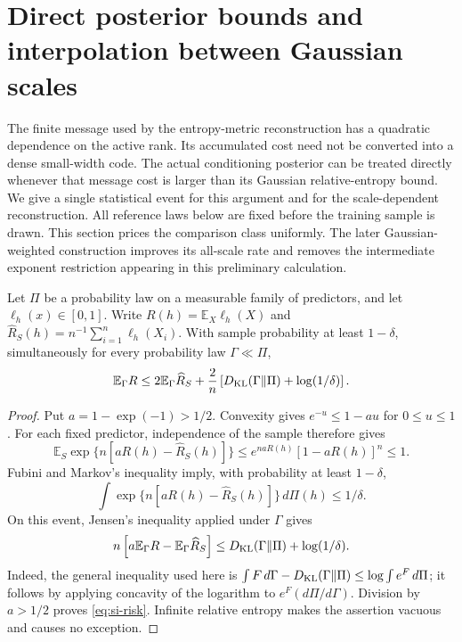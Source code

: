 \section{Direct posterior bounds and interpolation between Gaussian scales}
\label{app:scale-interpolation}

The finite message used by the entropy-metric reconstruction has a
quadratic dependence on the active rank. Its accumulated cost need not
be converted into a dense small-width code. The actual conditioning
posterior can be treated directly whenever that message cost is larger
than its Gaussian relative-entropy bound. We give a single statistical
event for this argument and for the scale-dependent reconstruction.
All reference laws below are fixed before the training sample is drawn.
This section prices the comparison class uniformly. The later
Gaussian-weighted construction improves its all-scale rate and removes
the intermediate exponent restriction appearing in this preliminary
calculation.

\begin{lemma}
\label{lem:si-risk}
Let $\Pi$ be a probability law on a measurable family of predictors,
and let $\ell_h(x)\in[0,1]$. Write
$R(h)=\mathbb E_X\ell_h(X)$ and
$\widehat R_S(h)=n^{-1}\sum_{i=1}^n\ell_h(X_i)$.
With sample probability at least $1-\delta$, simultaneously for every
probability law $\Gamma\ll\Pi$,
\begin{equation}\label{eq:si-risk}
 \mathbb E_\Gamma R
 \le 2\mathbb E_\Gamma\widehat R_S
       +\frac{2}{n}
          \left[D_{\rm KL}(\Gamma\Vert\Pi)+\log(1/\delta)\right].
\end{equation}
\end{lemma}
\begin{proof}
Put $a=1-\exp(-1)>1/2$. Convexity gives
$e^{-u}\le1-au$ for $0\le u\le1$. For each fixed predictor,
independence of the sample therefore gives
\[
 \mathbb E_S\exp\{n[aR(h)-\widehat R_S(h)]\}
 \le e^{naR(h)}[1-aR(h)]^n\le1.
\]
Fubini and Markov's inequality imply, with probability at least
$1-\delta$,
\[
 \int\exp\{n[aR(h)-\widehat R_S(h)]\}\,d\Pi(h)
 \le1/\delta.
\]
On this event, Jensen's inequality applied under $\Gamma$ gives
\[
 n\left[a\mathbb E_\Gamma R-
                   \mathbb E_\Gamma\widehat R_S\right]
 \le D_{\rm KL}(\Gamma\Vert\Pi)+\log(1/\delta).
\]
Indeed, the general inequality used here is
$\int F\,d\Gamma-D_{\rm KL}(\Gamma\Vert\Pi)
 \le\log\int e^F\,d\Pi$; it follows by applying concavity of the
logarithm to $e^F(d\Pi/d\Gamma)$. Division by $a>1/2$ proves
\eqref{eq:si-risk}. Infinite relative entropy makes the assertion
vacuous and causes no exception.
\end{proof}

